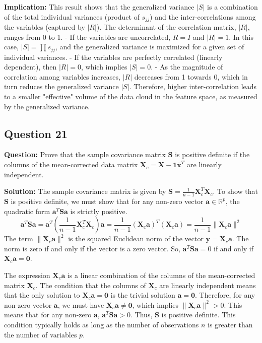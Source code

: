 \textbf{Implication:}
This result shows that the generalized variance $|S|$ is a combination of the total individual variances (product of $s_{jj}$) and the inter-correlations among the variables (captured by $|R|$).
The determinant of the correlation matrix, $|R|$, ranges from 0 to 1.
- If the variables are uncorrelated, $R=I$ and $|R|=1$. In this case, $|S| = \prod s_{jj}$, and the generalized variance is maximized for a given set of individual variances.
- If the variables are perfectly correlated (linearly dependent), then $|R|=0$, which implies $|S|=0$.
- As the magnitude of correlation among variables increases, $|R|$ decreases from 1 towards 0, which in turn reduces the generalized variance $|S|$. Therefore, higher inter-correlation leads to a smaller "effective" volume of the data cloud in the feature space, as measured by the generalized variance.

\subsection*{Question 21}
\textbf{Question:} Prove that the sample covariance matrix $\mathbf{S}$ is positive definite if the columns of the mean-corrected data matrix $\mathbf{X}_c = \mathbf{X} - \mathbf{1}\bar{\mathbf{x}}^{T}$ are linearly independent.

\textbf{Solution:}
The sample covariance matrix is given by $\mathbf{S} = \frac{1}{n-1}\mathbf{X}_c^T \mathbf{X}_c$.
To show that $\mathbf{S}$ is positive definite, we must show that for any non-zero vector $\mathbf{a} \in \mathbb{R}^p$, the quadratic form $\mathbf{a}^T \mathbf{S} \mathbf{a}$ is strictly positive.
$$ \mathbf{a}^T \mathbf{S} \mathbf{a} = \mathbf{a}^T \left(\frac{1}{n-1}\mathbf{X}_c^T \mathbf{X}_c\right) \mathbf{a} = \frac{1}{n-1} (\mathbf{X}_c \mathbf{a})^T (\mathbf{X}_c \mathbf{a}) = \frac{1}{n-1} \|\mathbf{X}_c \mathbf{a}\|^2 $$
The term $\|\mathbf{X}_c \mathbf{a}\|^2$ is the squared Euclidean norm of the vector $\mathbf{y} = \mathbf{X}_c \mathbf{a}$. The norm is zero if and only if the vector is a zero vector.
So, $\mathbf{a}^T \mathbf{S} \mathbf{a} = 0$ if and only if $\mathbf{X}_c \mathbf{a} = \mathbf{0}$.

The expression $\mathbf{X}_c \mathbf{a}$ is a linear combination of the columns of the mean-corrected matrix $\mathbf{X}_c$.
The condition that the columns of $\mathbf{X}_c$ are linearly independent means that the only solution to $\mathbf{X}_c \mathbf{a} = \mathbf{0}$ is the trivial solution $\mathbf{a} = \mathbf{0}$.
Therefore, for any non-zero vector $\mathbf{a}$, we must have $\mathbf{X}_c \mathbf{a} \neq \mathbf{0}$, which implies $\|\mathbf{X}_c \mathbf{a}\|^2 > 0$.
This means that for any non-zero $\mathbf{a}$, $\mathbf{a}^T \mathbf{S} \mathbf{a} > 0$.
Thus, $\mathbf{S}$ is positive definite. This condition typically holds as long as the number of observations $n$ is greater than the number of variables $p$.

